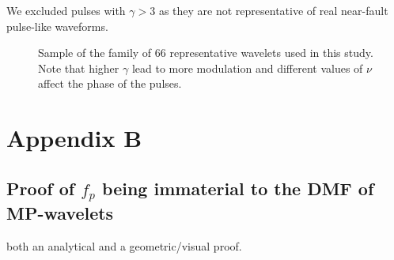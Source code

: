 We excluded pulses with \(\gamma > 3\) as they are not representative of
real near-fault pulse-like waveforms.

\begin{figure}
\centering
{}
\caption{Sample of the family of 66 representative wavelets used in this
study. Note that higher \(\gamma\) lead to more modulation and different
values of \(\nu\) affect the phase of the pulses.}
\end{figure}

\section{Appendix B}\label{appendix-b}

\subsection{\texorpdfstring{Proof of \(f_p\) being immaterial to the DMF
of
MP-wavelets}{Proof of f\_p being immaterial to the DMF of MP-wavelets}}\label{proof-of-f_p-being-immaterial-to-the-dmf-of-mp-wavelets}

both an analytical and a geometric/visual proof.

